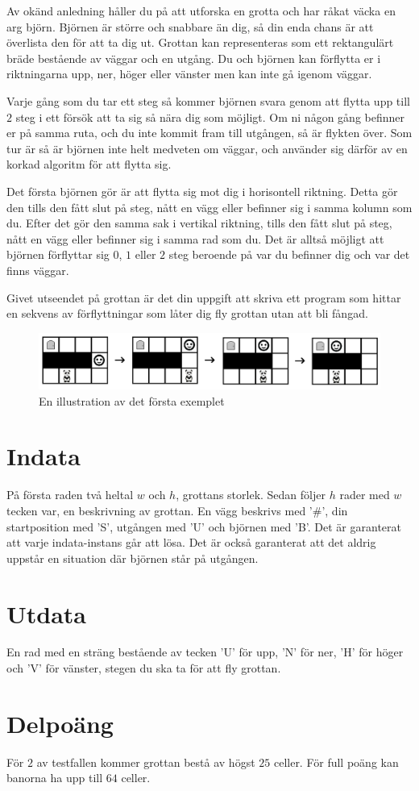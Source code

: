 Av okänd anledning håller du på att utforska en grotta och har råkat väcka en arg björn. Björnen är större och snabbare än dig, så din enda chans är att överlista den för att ta dig ut. Grottan kan representeras som ett rektangulärt bräde bestående av väggar och en utgång. Du och björnen kan förflytta er i riktningarna upp, ner, höger eller vänster men kan inte gå igenom väggar.

Varje gång som du tar ett steg så kommer björnen svara genom att flytta upp till $2$ steg i ett försök att ta sig så nära dig som möjligt. Om ni någon gång befinner er på samma ruta, och du inte kommit fram till utgången, så är flykten över. Som tur är så är björnen inte helt medveten om väggar, och använder sig därför av en korkad algoritm för att flytta sig.

Det första björnen gör är att flytta sig mot dig i horisontell riktning. Detta gör den tills den fått slut på steg, nått en vägg eller befinner sig i samma kolumn som du. Efter det gör den samma sak i vertikal riktning, tills den fått slut på steg, nått en vägg eller befinner sig i samma rad som du. Det är alltså möjligt att björnen förflyttar sig $0$, $1$ eller $2$ steg beroende på var du befinner dig och var det finns väggar.

Givet utseendet på grottan är det din uppgift att skriva ett program som hittar en sekvens av förflyttningar som låter dig fly grottan utan att bli fångad.

\begin{figure}[ht!]
\centering
\includegraphics[width=\textwidth]{grottflykt.png}
\caption{En illustration av det första exemplet}
\label{overflow}
\end{figure}

\section*{Indata}
På första raden två heltal $w$ och $h$, grottans storlek. Sedan följer $h$ rader med $w$ tecken var, en beskrivning av grottan. En vägg beskrivs med '\#', din startposition med 'S', utgången med 'U' och björnen med 'B'. Det är garanterat att varje indata-instans går att lösa. Det är också garanterat att det aldrig uppstår en situation där björnen står på utgången.

\section*{Utdata}
En rad med en sträng bestående av tecken 'U' för upp, 'N' för ner, 'H' för höger och 'V' för vänster, stegen du ska ta för att fly grottan.

\section*{Delpoäng}
För $2$ av testfallen kommer grottan bestå av högst $25$ celler. För full poäng kan banorna ha upp till $64$ celler.
